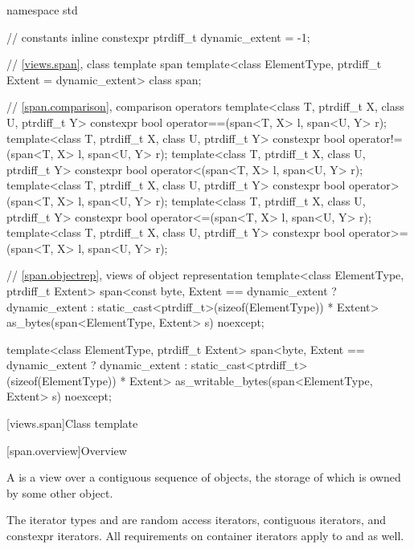 \begin{codeblock}
\begin{codeblock}
\begin{codeblock}
\begin{codeblock}
namespace std {
  // constants
  inline constexpr ptrdiff_t dynamic_extent = -1;

  // \ref{views.span}, class template span
  template<class ElementType, ptrdiff_t Extent = dynamic_extent>
    class span;

  // \ref{span.comparison}, comparison operators
  template<class T, ptrdiff_t X, class U, ptrdiff_t Y>
    constexpr bool operator==(span<T, X> l, span<U, Y> r);
  template<class T, ptrdiff_t X, class U, ptrdiff_t Y>
    constexpr bool operator!=(span<T, X> l, span<U, Y> r);
  template<class T, ptrdiff_t X, class U, ptrdiff_t Y>
    constexpr bool operator<(span<T, X> l, span<U, Y> r);
  template<class T, ptrdiff_t X, class U, ptrdiff_t Y>
    constexpr bool operator>(span<T, X> l, span<U, Y> r);
  template<class T, ptrdiff_t X, class U, ptrdiff_t Y>
    constexpr bool operator<=(span<T, X> l, span<U, Y> r);
  template<class T, ptrdiff_t X, class U, ptrdiff_t Y>
    constexpr bool operator>=(span<T, X> l, span<U, Y> r);

  // \ref{span.objectrep}, views of object representation
  template<class ElementType, ptrdiff_t Extent>
    span<const byte,
         Extent == dynamic_extent ? dynamic_extent
                                  : static_cast<ptrdiff_t>(sizeof(ElementType)) * Extent>
      as_bytes(span<ElementType, Extent> s) noexcept;

  template<class ElementType, ptrdiff_t Extent>
    span<byte,
         Extent == dynamic_extent ? dynamic_extent
                                  : static_cast<ptrdiff_t>(sizeof(ElementType)) * Extent>
      as_writable_bytes(span<ElementType, Extent> s) noexcept;
}
\end{codeblock}

[views.span]{Class template }

[span.overview]{Overview}

\pnum
{}%
A  is a view over a contiguous sequence of objects,
the storage of which is owned by some other object.

\pnum
The iterator types  and  are
random access iterators,
contiguous iterators, and
constexpr iterators.
All requirements on container iterators apply to
 and  as well.


\end{codeblock}
\end{codeblock}
\end{codeblock}
